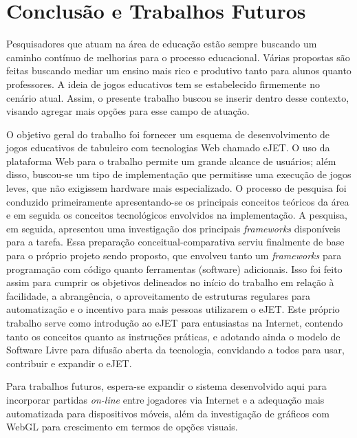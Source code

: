 \chapter{Conclusão e Trabalhos Futuros}

Pesquisadores que atuam na área de educação estão sempre buscando um caminho contínuo de melhorias para  o  processo educacional.  Várias propostas  são feitas buscando mediar  um ensino mais  rico e produtivo   tanto   para   alunos   quanto   professores.   A   ideia   de   jogos   educativos   tem   se   estabelecido firmemente no cenário atual. Assim, o presente trabalho buscou se inserir dentro desse contexto, visando agregar mais opções para esse campo de atuação.

O objetivo geral do trabalho foi fornecer um esquema de desenvolvimento de jogos educativos de tabuleiro com tecnologias Web chamado eJET. O uso da plataforma Web para o trabalho permite um grande alcance de usuários; além disso, buscou-se um tipo de implementação que permitisse uma execução de jogos leves, que não exigissem hardware mais especializado. O processo de pesquisa foi conduzido primeiramente apresentando-se os principais conceitos teóricos da área e em seguida os conceitos   tecnológicos   envolvidos   na   implementação.   A   pesquisa,   em   seguida,   apresentou   uma investigação dos principais \textit{frameworks} disponíveis para a tarefa. Essa preparação conceitual-comparativa serviu finalmente de base para o próprio projeto sendo proposto, que envolveu tanto um \textit{frameworks} para programação com código quanto ferramentas (software) adicionais. Isso foi feito assim para cumprir os objetivos delineados no início do trabalho em relação à facilidade, a abrangência, o aproveitamento de estruturas regulares para automatização e o incentivo para mais pessoas utilizarem o eJET. Este próprio trabalho serve como introdução ao eJET para entusiastas na Internet, contendo tanto os conceitos quanto as instruções práticas, e adotando ainda o modelo de Software Livre para difusão aberta da tecnologia, convidando a todos para usar, contribuir e expandir o eJET.

Para trabalhos futuros, espera-se expandir o sistema desenvolvido aqui para incorporar partidas \textit{on-line} entre   jogadores  via   Internet   e   a  adequação  mais   automatizada   para   dispositivos  móveis,   além   da investigação de gráficos com WebGL para crescimento em termos de opções visuais.

\label{Conclusao}
